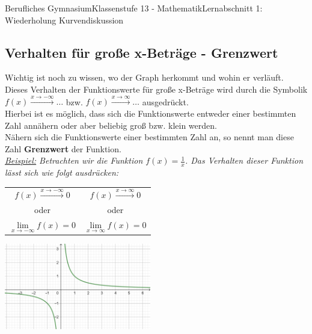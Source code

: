 \documentclass[11pt,twocolumn,oneside,openany,headings=optiontotoc,11pt,numbers=noenddot]{article}
\begin{document}
\begin{worksheet}{Berufliches Gymnasium}{Klassenstufe 13 - Mathematik}{Lernabschnitt 1: Wiederholung Kurvendiskussion}
		\subsection{Verhalten für große x-Beträge - Grenzwert}
		Wichtig ist noch zu wissen, wo der Graph herkommt und wohin er verläuft. Dieses Verhalten der Funktionswerte für große x-Beträge wird durch die Symbolik \(f(x) \xrightarrow{x\rightarrow-\infty} \ldots\) bzw. \(f(x) \xrightarrow{x\rightarrow\infty} \ldots\) ausgedrückt.\\
		Hierbei ist es möglich, dass sich die Funktionswerte entweder einer bestimmten Zahl annähern oder aber beliebig groß bzw. klein werden.\\
		Nähern sich die Funktionswerte einer bestimmten Zahl an, so nennt man diese Zahl \textbf{Grenzwert} der Funktion.\\
		\textit{\underline{Beispiel:} Betrachten wir die Funktion \(f(x) = \frac{1}{x}\). Das Verhalten dieser Funktion lässt sich wie folgt ausdrücken:}\\
		\par\noindent
		\begin{tabularx}{0.5\textwidth}{c|c}
			\(f(x)\xrightarrow{x\rightarrow-\infty}0\) & \(f(x)\xrightarrow{x\rightarrow\infty}0\)\\
			\multicolumn{1}{c|}{oder} & \multicolumn{1}{c}{oder}\\
			\(\lim\limits_{x\rightarrow-\infty}f(x) = 0\) & \(\lim\limits_{x\rightarrow\infty}f(x) = 0\)
		\end{tabularx}
		\par\bigskip\noindent
		\includegraphics[width=0.48\textwidth]{../99_Bilder/00_Wdh/gw.png}

\end{worksheet}
\end{document}

